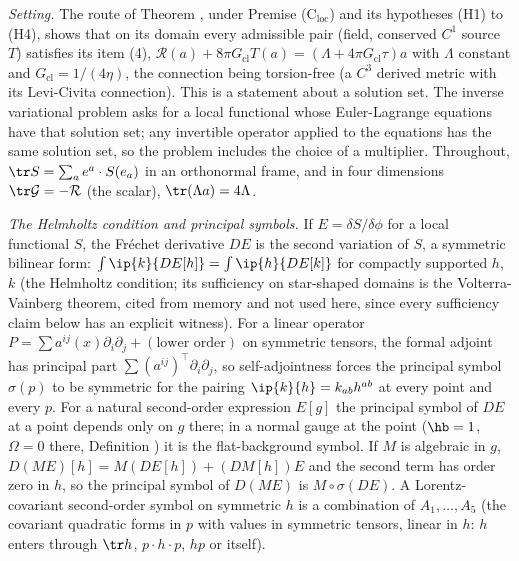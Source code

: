 \emph{Setting.} The route of Theorem , under Premise (C$_{\mathrm{loc}}$) and its hypotheses (H1) to (H4), shows that on its domain every admissible pair (field, conserved $C^{1}$ source $T$) satisfies its item (4), $\mathcal{R}(a) + 8\pi G_{\mathrm{cl}}T(a) = (\Lambda + 4\pi G_{\mathrm{cl}}\tau)a$ with $\Lambda$ constant and $G_{\mathrm{cl}} = 1/(4\eta)$, the connection being torsion-free (a $C^{3}$ derived metric with its Levi-Civita connection). This is a statement about a solution set. The inverse variational problem asks for a local functional whose Euler-Lagrange equations have that solution set; any invertible operator applied to the equations has the same solution set, so the problem includes the choice of a multiplier. Throughout, $\tr S = \sum_{a} e^{a}\cdot S(e_{a})$ in an orthonormal frame, and in four dimensions $\tr\mathcal{G} = -\mathcal{R}$ (the scalar), $\tr(\Lambda a) = 4\Lambda$.

\emph{The Helmholtz condition and principal symbols.} If $E = \delta S/\delta\phi$ for a local functional $S$, the Fr\'echet derivative $DE$ is the second variation of $S$, a symmetric bilinear form: $\int \ip{k}{DE[h]} = \int \ip{h}{DE[k]}$ for compactly supported $h$, $k$ (the Helmholtz condition; its sufficiency on star-shaped domains is the Volterra-Vainberg theorem, cited from memory and not used here, since every sufficiency claim below has an explicit witness). For a linear operator $P = \sum a^{ij}(x)\partial_{i}\partial_{j} + (\text{lower order})$ on symmetric tensors, the formal adjoint has principal part $\sum (a^{ij})^{\top}\partial_{i}\partial_{j}$, so self-adjointness forces the principal symbol $\sigma(p)$ to be symmetric for the pairing $\ip{k}{h} = k_{ab}h^{ab}$ at every point and every $p$. For a natural second-order expression $E[g]$ the principal symbol of $DE$ at a point depends only on $g$ there; in a normal gauge at the point ($\hb = 1$, $\Omega = 0$ there, Definition ) it is the flat-background symbol. If $M$ is algebraic in $g$, $D(ME)[h] = M(DE[h]) + (DM[h])E$ and the second term has order zero in $h$, so the principal symbol of $D(ME)$ is $M\circ\sigma(DE)$. A Lorentz-covariant second-order symbol on symmetric $h$ is a combination of $A_{1}, \dots, A_{5}$ (the covariant quadratic forms in $p$ with values in symmetric tensors, linear in $h$: $h$ enters through $\tr h$, $p\cdot h\cdot p$, $hp$ or itself).


